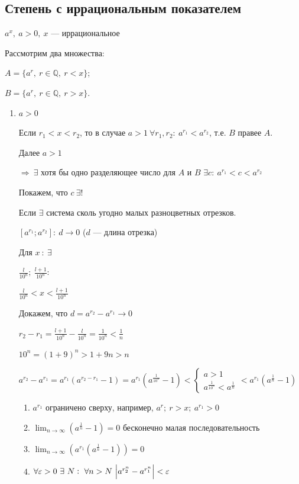 \documentclass{article}
\begin{document}
    \subsection{Степень с иррациональным показателем}

    \( a^x,\ a > 0,\ x \) --- иррациональное

    Рассмотрим два множества:

    \( A = \{ a^r,\ r \in \mathbb{Q},\ r < x \} \);

    \( B = \{ a^r,\ r \in \mathbb{Q},\ r > x \} \).

    \begin{enumerate}
        \item \(a > 0\)
    
            Если \( r_1 < x < r_2 \), то в случае \( a > 1\ \forall r_1, r_2:\ a^{r_1} < a^{r_2} \), т.е. \(B\) правее \(A\).

            Далее \( a > 1 \)
            
            \(\Rightarrow\ \exists\) хотя бы одно разделяющее число для \(A\) и \(B\) \(\exists c :\ a^{r_1} < c < a^{r_2}\)

            Покажем, что \(c\ \exists !\)

            Если \(\exists\) система сколь угодно малых разноцветных отрезков. 
            
            \([a^{r_1}; a^{r_2}]:\ d \rightarrow 0\) ($d$ --- длина отрезка)
            
            Для \(x\ :\ \exists\)

            \(\frac{l}{10^n};\ \frac{l+1}{10^n}:\ \)

            \(\frac{l}{10^n} < x < \frac{l+1}{10^n}\)

            Докажем, что \(d = a^{r_2} - a^{r_1} \rightarrow 0\) 

            \( r_2 - r_1 = \frac{l + 1}{10^n} - \frac{l}{10^n} = \frac{1}{10^n} < \frac{1}{n} \)

            \( 10^n = (1 + 9)^n > 1 + 9n > n \)

            \( a^{r_2} - a^{r_1} = a^{r_1}(a^{r_2 - r_1} - 1) = a^{r_1}(a^{\frac{1}{10^n}} - 1) < \begin{cases}
                a > 1\\
                a^{\frac{1}{10^n}} < a^\frac{1}{n}
            \end{cases} < a^{r_1}(a^\frac{1}{n} - 1)\)

            \begin{enumerate}
                \item \( a^{r_1} \) ограничено сверху, например, \( a^r;\ r > x;\ a^{r_1} > 0 \)
                \item \( \lim_{n \to \infty}(a^\frac{1}{n} - 1) = 0 \) бесконечно малая последовательность
                \item \( \lim_{n \to \infty}(a^{r_1}(a^\frac{1}{n} - 1)) = 0\)
                \item \(\forall \varepsilon > 0\ \exists\ N:\ \forall n > N\ \abs{a^{r_2^n} - a^{r_1^n}} < \varepsilon\)
            \end{enumerate}
            

\end{enumerate}
\end{document}
